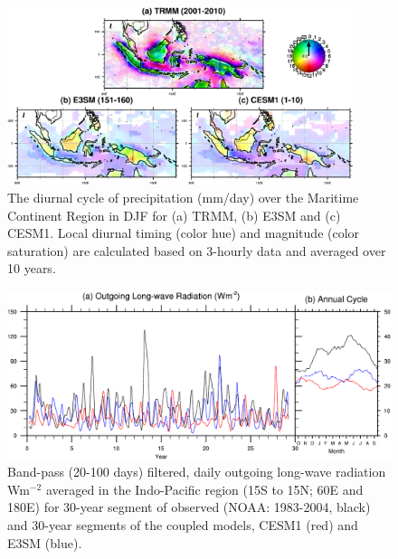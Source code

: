 \documentclass[draft,ms]{AGUTeX}
\begin{document}
\begin{article}
\begin{figure}[fp]
  \begin{center}
    \noindent\includegraphics[width=0.9\textwidth,angle=0.]{./figs/f_dcycle_indo.pdf}
  \end{center}
  \caption{The diurnal cycle of precipitation (mm/day) over the Maritime Continent Region in DJF for (a) TRMM, (b) E3SM and (c) CESM1. Local diurnal timing (color hue) and magnitude (color saturation) are calculated based on 3-hourly data and averaged over 10 years.}
\label{f_dcycle_indo}
\end{figure}

\begin{figure}[t]
  \begin{center}
    \noindent \includegraphics[width=1.1\textwidth,angle=0.] {./figs/f_bpass.pdf}
  \end{center}
  \caption{Band-pass (20-100 days) filtered, daily outgoing long-wave radiation Wm$^{-2}$ averaged in the Indo-Pacific region (15\deg S to  15\deg N; 60\deg E and 180\deg E) for 30-year segment of observed (NOAA: 1983-2004, black) and 30-year segments of the coupled models, CESM1 (red) and E3SM (blue).}
\label{f_bpass}
\end{figure}


\end{article}
\end{document}

